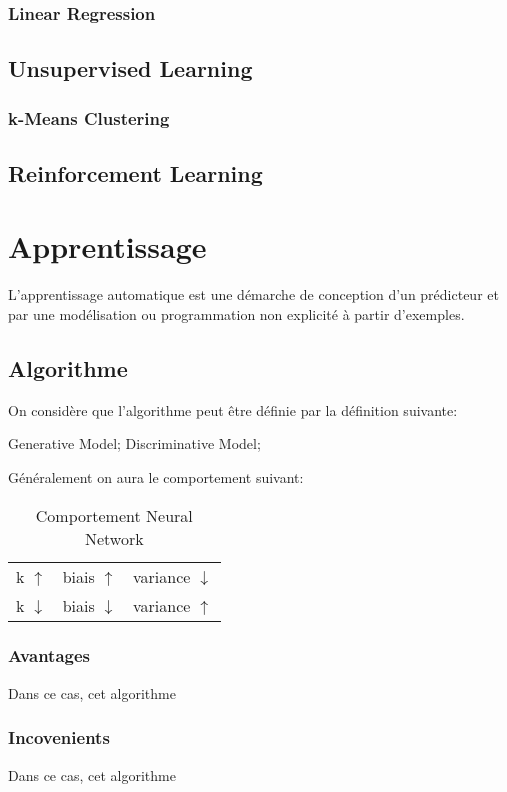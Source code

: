 \documentclass{article}
\begin{document}
\subsubsection{Linear Regression}

\subsection{Unsupervised Learning}
\subsubsection{k-Means Clustering}


\subsection{Reinforcement Learning}


\section{Apprentissage}
L'apprentissage automatique est une démarche de conception d'un prédicteur et par une modélisation ou programmation non explicité à partir d'exemples.

\subsection{Algorithme}
On considère que l'algorithme peut être définie par la définition suivante:
\begin{definition}
    Generative Model;
    Discriminative Model;
\end{definition}

Généralement on aura le comportement suivant:
\begin{table}[H]
    \centering\begin{tabular}{lll}
        k $\uparrow  $ & biais $\uparrow  $ & variance $\downarrow$\\
        k $\downarrow$ & biais $\downarrow$ & variance $\uparrow$\\
    \end{tabular}
    \caption{Comportement Neural Network}
\end{table}

\subsubsection{Avantages}
Dans ce cas, cet algorithme 

\subsubsection{Incovenients}
Dans ce cas, cet algorithme 
\end{document}
